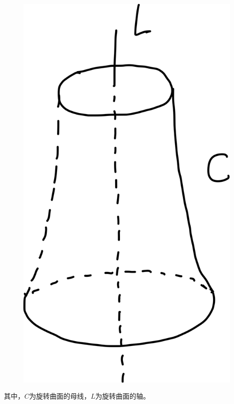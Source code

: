 \documentclass[12pt, a4paper]{article}
\numberwithin{equation}{section}
\begin{document}
    \begin{figure}[htbp]
        \centering
        \includegraphics[scale=0.08]{"Chapter 08 images/pic3.png"}
    \end{figure}

    其中，\(C\)为旋转曲面的母线，\(L\)为旋转曲面的轴。
\end{document}
